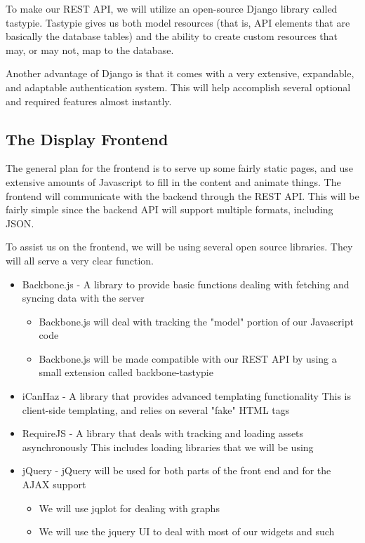 To make our \ac{REST} \ac{API}, we will utilize an open-source Django library called tastypie.
Tastypie gives us both model resources (that is, \ac{API} elements that are basically the database tables) and the ability to create custom resources that may, or may not, map to the database.

Another advantage of Django is that it comes with a very extensive, expandable, and adaptable authentication system.
This will help accomplish several optional and required features almost instantly.


\subsection{The Display Frontend}

The general plan for the frontend is to serve up some fairly static pages, and use extensive amounts of Javascript to fill in the content and animate things.
The frontend will communicate with the backend through the \ac{REST} \ac{API}.
This will be fairly simple since the backend \ac{API} will support multiple formats, including \ac{JSON}.

To assist us on the frontend, we will be using several open source libraries.
They will all serve a very clear function.

\begin{itemize}
 \item Backbone.js - A library to provide basic functions dealing with fetching and syncing data with the server \cite{Web:Backbone}
 \begin{itemize}
  \item Backbone.js will deal with tracking the "model" portion of our Javascript code
  \item Backbone.js will be made compatible with our \ac{REST} \ac{API} by using a small extension called backbone-tastypie \cite{Web:Backbone-TastyPie}
 \end{itemize}
 \item iCanHaz - A library that provides advanced templating functionality
This is client-side templating, and relies on several "fake" \ac{HTML} tags \cite{Web:iCanHaz}
 \item RequireJS - A library that deals with tracking and loading assets asynchronously
This includes loading libraries that we will be using \cite{Web:RequireJS}
 \item jQuery - jQuery will be used for both parts of the front end and for the AJAX support \cite{Web:jQuery}
 \begin{itemize}
  \item We will use jqplot for dealing with graphs
  \item We will use the jquery UI to deal with most of our widgets and such
 \end{itemize}
\end{itemize}

